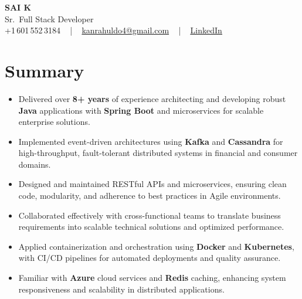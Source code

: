 \documentclass[letterpaper,11pt]{article}
\newcommand{\resumeItem}[1]{
  \item\footnotesize{
    {#1 \vspace{-2pt}}
  }
}
\newcommand{\resumeItemListStart}{\begin{itemize}[leftmargin=*]}
\newcommand{\resumeItemListEnd}{\end{itemize}\vspace{-5pt}}
\begin{document}
\begin{center}
    {\fontsize{14pt}{12pt}\selectfont \textbf{\MakeUppercase{Sai K}}}\\ \vspace{2pt}
    \fontsize{10pt}{12pt}\selectfont Sr.\ Full Stack Developer\\ \vspace{2pt}
    \fontsize{10pt}{12pt}\selectfont +1\,601\,552\,3184 ~ | ~
    \href{mailto:kanrahuldo4@gmail.com}{kanrahuldo4@gmail.com} ~ | ~
    \href{https://www.linkedin.com/in/srrrk/}{\color{blue}\underline{LinkedIn}}
    \vspace{-10pt}
\end{center}

\section{Summary}
\fontsize{9pt}{10pt}\selectfont
\resumeItemListStart
  \resumeItem{Delivered over \textbf{8+ years} of experience architecting and developing robust \textbf{Java} applications with \textbf{Spring Boot} and microservices for scalable enterprise solutions.}
  \resumeItem{Implemented event-driven architectures using \textbf{Kafka} and \textbf{Cassandra} for high-throughput, fault-tolerant distributed systems in financial and consumer domains.}
  \resumeItem{Designed and maintained RESTful APIs and microservices, ensuring clean code, modularity, and adherence to best practices in Agile environments.}
  \resumeItem{Collaborated effectively with cross-functional teams to translate business requirements into scalable technical solutions and optimized performance.}
  \resumeItem{Applied containerization and orchestration using \textbf{Docker} and \textbf{Kubernetes}, with CI/CD pipelines for automated deployments and quality assurance.}
  \resumeItem{Familiar with \textbf{Azure} cloud services and \textbf{Redis} caching, enhancing system responsiveness and scalability in distributed applications.}
\resumeItemListEnd
\vspace{-6pt}

\end{document}
